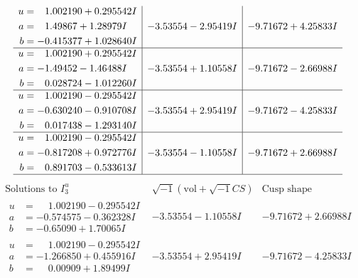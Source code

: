 \documentclass[1p]{elsarticle_modified}
\theoremstyle{definition}
\newcommand{\I}{\sqrt{-1}}
\begin{document}
$$\begin{array}{c|c|c}
\begin{aligned}
u &= \phantom{-}1.002190 + 0.295542 I \\
a &= \phantom{-}1.49867 + 1.28979 I \\
b &= -0.415377 + 1.028640 I\end{aligned}
 & -3.53554 - 2.95419 I & -9.71672 + 4.25833 I \\ \hline\begin{aligned}
u &= \phantom{-}1.002190 + 0.295542 I \\
a &= -1.49452 - 1.46488 I \\
b &= \phantom{-}0.028724 - 1.012260 I\end{aligned}
 & -3.53554 + 1.10558 I & -9.71672 - 2.66988 I \\ \hline\begin{aligned}
u &= \phantom{-}1.002190 - 0.295542 I \\
a &= -0.630240 - 0.910708 I \\
b &= \phantom{-}0.017438 - 1.293140 I\end{aligned}
 & -3.53554 + 2.95419 I & -9.71672 - 4.25833 I \\ \hline\begin{aligned}
u &= \phantom{-}1.002190 - 0.295542 I \\
a &= -0.817208 + 0.972776 I \\
b &= \phantom{-}0.891703 - 0.533613 I\end{aligned}
 & -3.53554 - 1.10558 I & -9.71672 + 2.66988 I\\
 \hline 
 \end{array}$$\newpage$$\begin{array}{c|c|c}  
\text{Solutions to }I^u_{3}& \I (\text{vol} + \sqrt{-1}CS) & \text{Cusp shape}\\
 \hline 
\begin{aligned}
u &= \phantom{-}1.002190 - 0.295542 I \\
a &= -0.574575 - 0.362328 I \\
b &= -0.65090 + 1.70065 I\end{aligned}
 & -3.53554 - 1.10558 I & -9.71672 + 2.66988 I \\ \hline\begin{aligned}
u &= \phantom{-}1.002190 - 0.295542 I \\
a &= -1.266850 + 0.455916 I \\
b &= \phantom{-}0.00909 + 1.89499 I\end{aligned}
 & -3.53554 + 2.95419 I & -9.71672 - 4.25833 I \\ \hline\begin{aligned}

\end{aligned}
\end{array}$$
\end{document}
